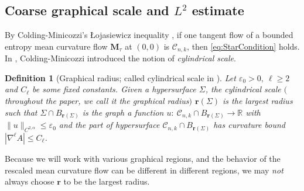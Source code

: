 \documentclass[11pt]{amsart}
\numberwithin{equation}{section}
\newtheorem{definition}[theorem]{Definition}
\numberwithin{equation}{section}
\newcommand{\eps}{\varepsilon}
\newcommand{\br}{\mathbf{r}}
\newcommand{\bM}{\mathbf{M}}
\newcommand{\cC}{\mathcal{C}}
\newcommand{\R}{\mathbb{R}}
\begin{document}
	
	
	\subsection{Coarse graphical scale and $L^2$ estimate}\label{SSCM}
	
	By Colding-Minicozzi's {\L}ojasiewicz inequality \cite{CM2}, if one tangent flow of a bounded entropy mean curvature flow $\bM_{\tau}$ at $(0,0)$ is $\cC_{n,k}$, then \eqref{eq:StarCondition} holds. In \cite{CM2}, Colding-Minicozzi introduced the notion of \emph{cylindrical scale}.	
	
	\begin{definition}[Graphical radius; called cylindrical scale in \cite{CM2}]\label{DefGraphRad} Let $\eps_0>0,\ \ell\geq 2$ and $C_{\ell}$ be some fixed constants.
		Given a hypersurface $\Sigma$, the cylindrical scale $($throughout the paper, we call it the \emph{graphical radius}$)$ $\br(\Sigma)$ is the largest radius such that $\Sigma \cap B_{\br(\Sigma)}$ is the graph a function $u:\ \cC_{n,k}\cap B_{\br(\Sigma)}\to \R$ with $\|u\|_{C^{2,\alpha}}\leq \eps_0$ and the part of hypersurface $\cC_{n,k} \cap B_{\br(\Sigma)}$ has curvature bound $|\nabla^\ell A|\leq C_{\ell}$. 
	\end{definition}
	
	Because we will work with various graphical regions, and the behavior of the rescaled mean curvature flow can be different in different regions, we may \emph{not} always choose $\br$ to be the largest radius.
	
\end{document}
